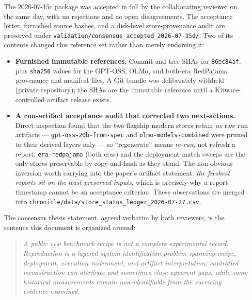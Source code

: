 \documentclass[11pt]{report}
\newcommand{\code}[1]{\texttt{#1}}
\newcommand{\file}[1]{\texttt{#1}}
\begin{document}
The 2026-07-15c package was accepted in full by the collaborating reviewer on the
same day, with no rejections and no open disagreements. The acceptance letter,
furnished source hashes, and a disk-level store-provenance audit are preserved under
\file{validation/consensus\_accepted\_2026-07-15d/}. Two of its contents changed
this reference set rather than merely endorsing it:

\begin{itemize}[nosep]
  \item \textbf{Furnished immutable references.} Commit and tree SHAs for
        \code{86ec84af}, plus \code{sha256} values for the GPT-OSS, OLMo, and
        both-era RedPajama provenance and manifest files. A Git bundle was
        deliberately withheld (private repository); the SHAs are the immutable
        reference until a Kitware-controlled artifact release exists.
  \item \textbf{A run-artifact acceptance audit that corrected two next-actions.}
        Direct  inspection found that the two flagship modern stores
        retain \emph{no} raw run artifacts --- \code{gpt-oss-20b-from-spec} and
        \code{olmo-models-combined} were pruned to their derived layers only --- so
        ``regenerate'' means \emph{re-run}, not refresh a report.
        \code{era-redpajama} (both eras) and the deployment-match sweeps are the
        only stores preservable by copy-and-hash as they stand. The
        non-obvious inversion worth carrying into the paper's artifact statement:
        \emph{the freshest reports sit on the least-preserved inputs}, which is
        precisely why a report timestamp cannot be an acceptance criterion. These
        observations are merged into
        \file{chronicle/data/store\_status\_ledger\_2026-07-27.csv}.
\end{itemize}

The consensus thesis statement, agreed verbatim by both reviewers, is the sentence
this document is organized around:

\begin{quote}\itshape
A public \textsc{llm} benchmark recipe is not a complete experimental record.
Reproduction is a layered system-identification problem spanning recipe, deployment,
execution instrument, and artifact interpretation; controlled reconstruction can
attribute and sometimes close apparent gaps, while some historical measurements
remain non-identifiable from the surviving evidence examined.
\end{quote}
\end{document}
